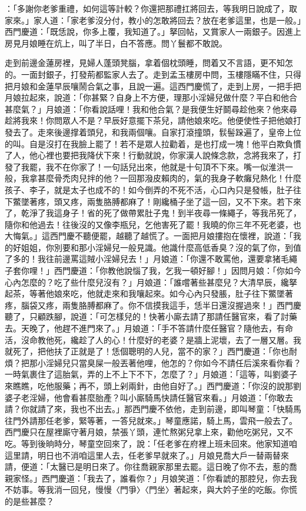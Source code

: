 \begin{showcontents}{}
：「多謝你老爹重禮，如何這等計較？你還把那禮扛將回去，等我明日說成了，取家來。」家人道：「家老爹沒分付，教小的怎敢將回去？放在老爹這里，也是一般。」西門慶道：「既恁說，你多上覆，我知道了。」拏回帖，又賞家人一兩銀子。因進上房見月娘睡在炕上，叫了半日，白不答應。問丫鬟都不敢說。

走到前邊金蓮房裡，見婦人蓬頭凳腦，拿着個枕頭睡，問着又不言語，更不知怎的。一面封銀子，打發荊都監家人去了。走到孟玉樓房中問，玉樓隱瞞不住，只得把月娘和金蓮早辰嚷鬧合氣之事，且說一遍。這西門慶慌了，走到上房，一把手把月娘拉起來，說道：「你甚緊？自身上不方便，理那小淫婦兒做什麼？平白和他合甚麼氣？」月娘道：「你看說話哩！我和他合氣？是我便生好鬬尋趁他來？他來尋趁將我來！你問眾人不是？早辰好意擺下茶兒，請他娘來吃。他便使性子把他娘打發去了。走來後邊撑着頭兒，和我兩個嚷。自家打滾撞頭，䯼髻跺遍了，皇帝上位的叫。自是沒打在我臉上罷了！若不是眾人拉勸着，是也打成一塊！他平白欺負慣了人，他心裡也要把我降伏下來！行動就說，你家漢人說條念款，念將我來了，打發了我罷，我不在你家了！一句話兒出來，他就是十句頂不下來。嘴一似淮洪一般，我拿甚麼骨禿肉兒拌的他？一回那潑皮賴肉的，氣的我身子軟癱兒熱化！什麼孩子、李子，就是太子也成不的！如今倒弄的不死不活，心口內只是發帳，肚子往下鱉墜著疼，頭又疼，兩隻胳膊都麻了！剛纔桶子坐了這一回，又不下來。若下來了，乾淨了我這身子！省的死了做帶累肚子鬼！到半夜尋一條繩子，等我吊死了，隨你和他過去！往後沒的又像李瓶兒，乞他害死了罷！我曉的你三年不死老婆，也大悔氣。」這西門慶不聽便罷，越聽了越慌了。一面把月娘摟抱在懷裡，說道：「我的好姐姐，你別要和那小淫婦兒一般見識。他識什麼高低香臭？沒的氣了你，到值了多的！我往前邊罵這賊小淫婦兒去！」月娘道：「你還不敢罵他，還要拿猪毛繩子套你哩！」西門慶道：「你教他說惱了我，乞我一頓好腳！」因問月娘：「你如今心內怎麼的？吃了些什麼兒沒有？」月娘道：「誰嚐著些甚麼兒？大清早辰，纔拏起茶，等著他娘來吃，他就走來和我嚷起來。如今心內只發脹，肚子往下鱉墜著疼，腦袋又疼，兩隻胳膊都麻了。你不信摸我這手，恁半日還沒握過來！」西門慶聽了，只顧跌腳，說道：「可怎樣兒的！快著小廝去請了那請任醫官來，看了討藥去。天晚了，他趕不進門來了。」月娘道：「手不答請什麼任醫官？隨他去，有命活，沒命教他死，纔趁了人的心！什麼好的老婆？是牆上泥壞，去了一層又層。我就死了，把他扶了正就是了！恁個聰明的人兒，當不的家？」西門慶道：「你也耐煩？把那小淫婦兒只當臭屎一般丟著他哩，他怎的？你如今不請任后溪來看你看？一時氣裹住了這胎氣，弄的上不上下不下，怎麼了？」月娘道：「這等，叫劉婆子來瞧瞧，吃他服藥；再不，頭上剁兩針，由他自好了。」西門慶道：「你沒的說那劉婆子老淫婦，他會看甚麼胎產？叫小廝騎馬快請任醫官來看。」月娘道：「你敢去請？你就請了來，我也不出去。」那西門慶不依他，走到前邊，即叫琴童：「快騎馬往門外請那任老爹，緊等著，一答兒就來。」琴童應諾，騎上馬，雲飛一般去了。西門慶只在屋裡廝守著月娘，禁張丫頭，連忙熬粥兒拿上來，勸他吃粥兒，又不吃。等到後晌時分，琴童空回來了，說：「任老爹在府裡上班未回來。他家知道咱這里請，明日也不消咱這里人去，任老爹早就來了。」月娘見喬大戶一替兩替來請，便道：「太醫已是明日來了。你往喬親家那里去罷。這日晚了你不去，惹的喬親家怪。」西門慶道：「我去了，誰看你？」月娘笑道：「你看諕的那腔兒，你去我不妨事。等我消一回兒，慢慢〈門爭〉〈門坐〉著起來，與大妗子坐的吃飯。你慌的是些甚麼？
\end{showcontents}
